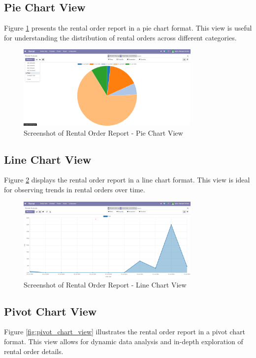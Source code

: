 \subsection{Pie Chart View}
Figure \ref{fig:pie_chart_view} presents the rental order report in a pie chart format. This view is useful for understanding the distribution of rental orders across different categories.

\begin{figure}[h]
    \centering
    \includegraphics[width=0.8\textwidth]{sprint3/reportpiechart.png} %
    \caption{Screenshot of Rental Order Report - Pie Chart View}
    \label{fig:pie_chart_view}
\end{figure}

\subsection{Line Chart View}
Figure \ref{fig:line_chart_view} displays the rental order report in a line chart format. This view is ideal for observing trends in rental orders over time.

\begin{figure}[h]
    \centering
    \includegraphics[width=0.8\textwidth]{sprint3/reportlinechart.png} %
    \caption{Screenshot of Rental Order Report - Line Chart View}
    \label{fig:line_chart_view}
\end{figure}

\subsection{Pivot Chart View}
Figure \ref{fig:pivot_chart_view} illustrates the rental order report in a pivot chart format. This view allows for dynamic data analysis and in-depth exploration of rental order details.

